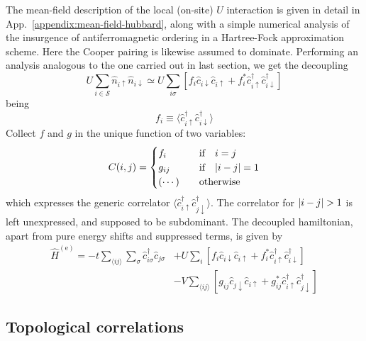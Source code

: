 The mean-field description of the local (on-site) $U$ interaction is given in detail in App.~\ref{appendix:mean-field-hubbard}, along with a simple numerical analysis of the insurgence of antiferromagnetic ordering in a Hartree-Fock approximation scheme. Here the Cooper pairing is likewise assumed to dominate. Performing an analysis analogous to the one carried out in last section, we get the decoupling
\[
	U \sum_{i \in \mathcal{S}} \hat n_{i\uparrow} \hat n_{i\downarrow} \simeq U \sum_{i\sigma} \left[
		f_i \hat c_{i\downarrow} \hat c_{i\uparrow} + f_i^* \hat c_{i\uparrow}^\dagger \hat c_{i\downarrow}^\dagger
	\right]
\]
being
\[
	f_i \equiv \langle \hat c_{i\uparrow}^\dagger \hat c_{i\downarrow}^\dagger \rangle
\]
Collect $f$ and $g$ in the unique function of two variables:
\[
	C(i,j) = \begin{cases}
		f_i &\qq{if} i=j \\
		g_{ij} &\qq{if} \abs{i-j}=1 \\
		(\cdots) &\qq{otherwise}
	\end{cases}
\]
which expresses the generic correlator $\langle \hat c_{i\uparrow}^\dagger \hat c_{j\downarrow}^\dagger \rangle$. The correlator for $\abs{i-j}>1$ is left unexpressed, and supposed to be subdominant. The decoupled hamiltonian, apart from pure energy shifts and suppressed terms, is given by
\begin{align}
	\hat H^{(\mathrm{e})} =
	-t \sum_{\langle ij \rangle} \sum_\sigma \hat c_{i\sigma}^\dagger \hat c_{j\sigma}
	&+ U \sum_i \left[
	f_i \hat c_{i\downarrow} \hat c_{i\uparrow} + f_i^* \hat c_{i\uparrow}^\dagger \hat c_{i\downarrow}^\dagger
	\right] \nonumber \\
	&- V \sum_{\langle ij \rangle} \left[
	g_{ij} \hat c_{j\downarrow} \hat c_{i\uparrow} + g_{ij}^* \hat c_{i\uparrow}^\dagger \hat c_{j\downarrow}^\dagger
	\right] \label{eq:extended-hubbard-model-effective}
\end{align}
\todo

\subsection{Topological correlations}

